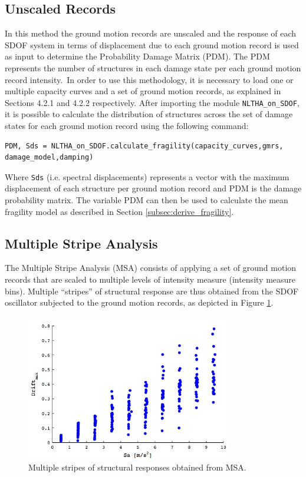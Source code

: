 \subsection{Unscaled Records}
\label{subsec:NLTHA-unscaled}

In this method the ground motion records are unscaled and the response of each SDOF system in terms of displacement due to each ground motion record is used as input to determine the Probability Damage Matrix (PDM). The PDM represents the number of structures in each damage state per each ground motion record intensity.\
In order to use this methodology, it is necessary to load one or multiple capacity curves and a set of ground motion records, as explained in Sections 4.2.1 and 4.2.2 respectively. After importing the module \verb=NLTHA_on_SDOF=, it is possible to calculate the distribution of structures across the set of damage states for each ground motion record using the following command:

\begin{Verbatim}[frame=single, commandchars=\\\{\}, samepage=true]
PDM, Sds = NLTHA_on_SDOF.calculate_fragility(capacity_curves,gmrs,
damage_model,damping)
\end{Verbatim}

Where \verb=Sds= (i.e. spectral displacements) represents a vector with the maximum displacement of each structure per ground motion record and PDM is the damage probability matrix. The variable PDM can then be used to calculate the mean fragility model as described in Section \ref{subsec:derive_fragility}.

\subsection{Multiple Stripe Analysis}
\label{subsec:NLTHA-MSA}
The Multiple Stripe Analysis (MSA) consists of applying a set of ground motion records that are scaled to multiple levels of intensity measure (intensity measure bins). Multiple “stripes” of structural response are thus obtained from the SDOF oscillator subjected to the ground motion records, as depicted in Figure \ref{fig:msa}.\

\begin{figure}[htb]
  \centering
      \includegraphics[width=9cm]{figures/MSA_example.jpg}
  \caption{Multiple stripes of structural responses obtained from MSA.}
  \label{fig:msa}
\end{figure}

